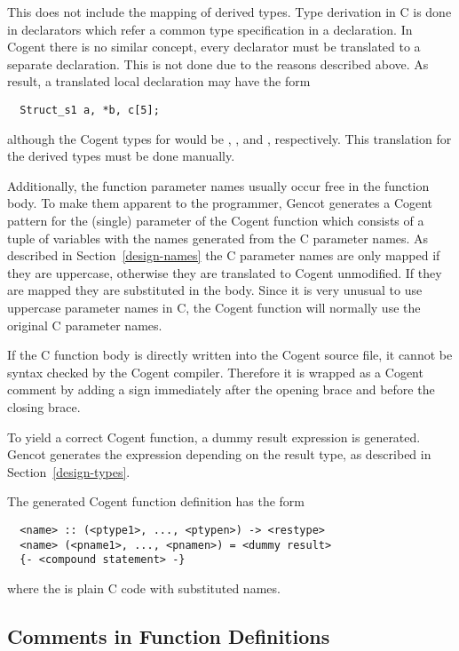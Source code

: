 This does not include the mapping of derived types. Type derivation in C is done in declarators which refer
a common type specification in a declaration. In Cogent there is no similar concept, every declarator must be 
translated to a separate declaration. This is not done due to the reasons described above. As result, a translated
local declaration may have the form
\begin{verbatim}
  Struct_s1 a, *b, c[5];
\end{verbatim}
although the Cogent types for  would be , , and 
, respectively. This translation for the derived types must be done manually.

Additionally, the function parameter names usually occur free in the function body. To make them apparent to
the programmer, Gencot generates a Cogent pattern for the (single) parameter of the Cogent function which 
consists of a tuple of variables with the names generated from the C parameter names. As described in 
Section~\ref{design-names} the C parameter names are only mapped if they are uppercase, otherwise they are
translated to Cogent unmodified. If they are mapped they are substituted in the body. Since it is very unusual
to use uppercase parameter names in C, the Cogent function will normally use the original C parameter names.

If the C function body is directly written into the Cogent source file, it cannot be syntax checked by the 
Cogent compiler. Therefore it is wrapped as a Cogent comment by adding a \code{-} sign immediately after the
opening brace and before the closing brace.

To yield a correct Cogent function, a dummy result expression is generated. Gencot generates the expression
depending on the result type, as described in Section~\ref{design-types}. 

The generated Cogent function definition has the form
\begin{verbatim}
  <name> :: (<ptype1>, ..., <ptypen>) -> <restype>
  <name> (<pname1>, ..., <pnamen>) = <dummy result>
  {- <compound statement> -}
\end{verbatim}
where the  is plain C code with substituted names.

\subsection{Comments in Function Definitions}

